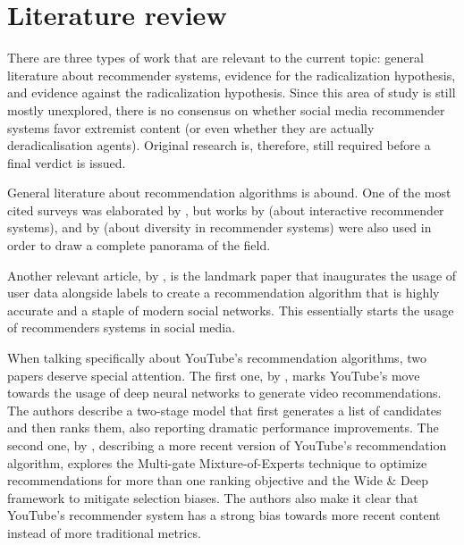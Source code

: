 
\chapter{Literature review}
\label{cap:review}

There are three types of work that are relevant to the current topic: general
literature about recommender systems, evidence for the radicalization
hypothesis, and evidence against the radicalization hypothesis. Since this area
of study is still mostly unexplored, there is no consensus on whether
social media recommender systems favor extremist content (or even whether they
are actually deradicalisation agents). Original research is, therefore, still
required before a final verdict is issued.

General literature about recommendation algorithms is abound. One of the most
cited surveys was elaborated by \citet{bobadilla_recommender_2013}, but
works by \citet{he_interactive_2016} (about interactive recommender systems),
and by \citet{kunaver_diversity_2017} (about diversity in recommender systems)
were also used in order to draw a complete panorama of the field.

Another relevant article, by \citet{guy_social_2010}, is the landmark paper that
inaugurates the usage of user data alongside labels to create a recommendation
algorithm that is highly accurate and a staple of modern social networks. This
essentially starts the usage of recommenders systems in social media.

When talking specifically about YouTube's recommendation algorithms, two papers
deserve special attention. The first one, by \citet{covington_deep_2016}, marks
YouTube's move towards the usage of deep neural networks to generate video
recommendations. The authors describe a two-stage model that first generates a
list of candidates and then ranks them, also reporting dramatic performance
improvements. The second one, by \citet{zhao_recommending_2019}, describing a
more recent version of YouTube's recommendation algorithm, explores the
Multi-gate Mixture-of-Experts technique to optimize recommendations for more
than one ranking objective and the Wide \& Deep framework to mitigate selection
biases. The authors also make it clear that YouTube's recommender system has a
strong bias towards more recent content instead of more traditional metrics.


